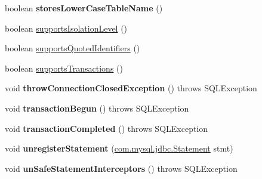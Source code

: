 \begin{DoxyCompactItemize}
boolean {\bfseries stores\+Lower\+Case\+Table\+Name} ()
\item 
boolean \mbox{\hyperlink{classcom_1_1mysql_1_1jdbc_1_1_multi_host_my_s_q_l_connection_a0c4936bc033352ae568d8ae567f6d495}{supports\+Isolation\+Level}} ()
\item 
boolean \mbox{\hyperlink{classcom_1_1mysql_1_1jdbc_1_1_multi_host_my_s_q_l_connection_af49bebe337318800930bddf6351d53f2}{supports\+Quoted\+Identifiers}} ()
\item 
boolean \mbox{\hyperlink{classcom_1_1mysql_1_1jdbc_1_1_multi_host_my_s_q_l_connection_a356916a7b3d5204fdd9886f9925816e7}{supports\+Transactions}} ()
\item 
\mbox{\label{classcom_1_1mysql_1_1jdbc_1_1_multi_host_my_s_q_l_connection_a9ea1cd910af7bfba39e38d73a6470229}} 
void {\bfseries throw\+Connection\+Closed\+Exception} ()  throws S\+Q\+L\+Exception 
\item 
\mbox{\label{classcom_1_1mysql_1_1jdbc_1_1_multi_host_my_s_q_l_connection_ac5d84acac27eb27c46a256b48986559b}} 
void {\bfseries transaction\+Begun} ()  throws S\+Q\+L\+Exception 
\item 
\mbox{\label{classcom_1_1mysql_1_1jdbc_1_1_multi_host_my_s_q_l_connection_adb04097a4467e123520ad1e8710389ea}} 
void {\bfseries transaction\+Completed} ()  throws S\+Q\+L\+Exception 
\item 
\mbox{\label{classcom_1_1mysql_1_1jdbc_1_1_multi_host_my_s_q_l_connection_a9bb5aaa536b26534f19635d557bc4f2a}} 
void {\bfseries unregister\+Statement} (\mbox{\hyperlink{interfacecom_1_1mysql_1_1jdbc_1_1_statement}{com.\+mysql.\+jdbc.\+Statement}} stmt)
\item 
\mbox{\label{classcom_1_1mysql_1_1jdbc_1_1_multi_host_my_s_q_l_connection_a947a3998ebc839c4a1125dd2bceb87e8}} 
void {\bfseries un\+Safe\+Statement\+Interceptors} ()  throws S\+Q\+L\+Exception 
\item 
\mbox{\label{classcom_1_1mysql_1_1jdbc_1_1_multi_host_my_s_q_l_connection_ac458645ba652606edebff3ab4c35088c}} 

\end{DoxyCompactItemize}
